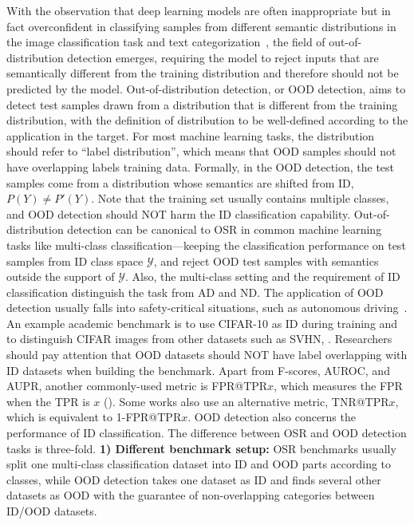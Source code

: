 \label{sec:tax_ood}
With the observation that deep learning models are often inappropriate but in fact overconfident in classifying samples from different semantic distributions in the image classification task and text categorization~, the field of out-of-distribution detection emerges, requiring the model to reject inputs that are semantically different from the training distribution and therefore should not be predicted by the model.
\smallskip
{}
Out-of-distribution detection, or OOD detection, aims to detect test samples drawn from a distribution that is different from the training distribution, with the definition of distribution to be well-defined according to the application in the target.
For most machine learning tasks, the distribution should refer to ``label distribution'', which means that OOD samples should not have overlapping labels \wrt training data.
Formally, in the OOD detection, the test samples come from a distribution whose semantics are shifted from ID, \ie $P(Y)\neq P'(Y)$.
Note that the training set usually contains multiple classes, and OOD detection should NOT harm the ID classification capability.
\smallskip
{}
Out-of-distribution detection can be canonical to OSR in common machine learning tasks like multi-class classification---keeping the classification performance on test samples from ID class space $\mathcal{Y}$, and reject OOD test samples with semantics outside the support of $\mathcal{Y}$. Also, the multi-class setting and the requirement of ID classification distinguish the task from AD and ND.
\smallskip
{}
The application of OOD detection usually falls into safety-critical situations, such as autonomous driving~.
An example academic benchmark is to use CIFAR-10 as ID during training and to distinguish CIFAR images from other datasets such as SVHN, \etc. 
Researchers should pay attention that OOD datasets should NOT have label overlapping with ID datasets when building the benchmark.
\smallskip
{}
Apart from F-scores, AUROC, and AUPR, another commonly-used metric is FPR@TPR$x$, which measures the FPR  when the TPR is $x$ (). Some works also use an alternative metric, TNR@TPR$x$, which is equivalent to 1-FPR@TPR$x$. OOD detection also concerns the performance of ID classification.
\smallskip
{}
The difference between OSR and OOD detection tasks is three-fold.
\noindent\textbf{1) Different benchmark setup:} OSR benchmarks usually split one multi-class classification dataset into ID and OOD parts according to classes, while OOD detection takes one dataset as ID and finds several other datasets as OOD with the guarantee of non-overlapping categories between ID/OOD datasets. 
